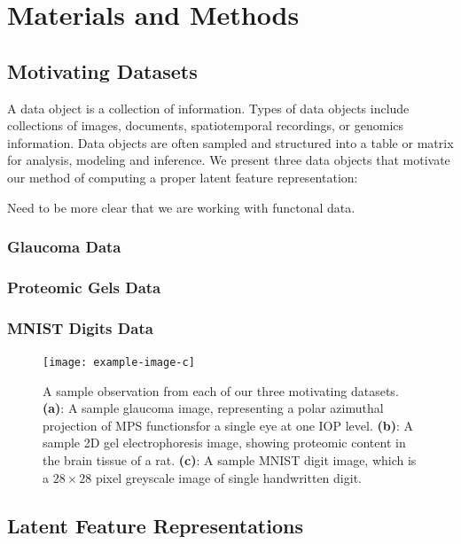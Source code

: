 \section{Materials and Methods}\label{sec:materials-and-methods}

\subsection{Motivating Datasets}\label{sec:motivating-datasets}
A data object is a collection of information. Types of data objects include collections of images, documents, spatiotemporal recordings, or genomics information. 
Data objects are often sampled and structured into a table or matrix for analysis, modeling and inference. 
We present three data objects that motivate our method of computing a proper latent feature representation:

{\color{purple}Need to be more clear that we are working with functonal data.}

\subsubsection{Glaucoma Data}




\subsubsection{Proteomic Gels Data}


\subsubsection{MNIST Digits Data}

\begin{figure}
    \centering
    \texttt{[image: example-image-c]}
    \caption{
    A sample observation from each of our three motivating datasets.
    \textbf{(a)}: A sample glaucoma image, representing a polar azimuthal projection of MPS functionsfor a single eye at one IOP level.
    \textbf{(b)}: A sample 2D gel electrophoresis image, showing proteomic content in the brain tissue of a rat.
    \textbf{(c)}: A sample MNIST digit image, which is a $28 \times 28$ pixel greyscale image of single handwritten digit.}
    \label{fig:enter-label}
\end{figure}

\subsection{Latent Feature Representations}

